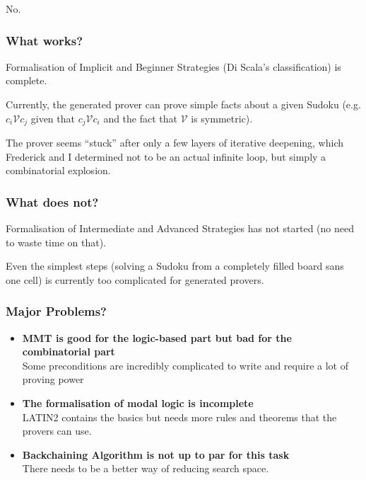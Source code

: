 \documentclass[aspectratio=169, usenames, dvipsnames]{beamer}
\newcommand{\MMT}{\textsf{MMT}\xspace}
\begin{document}
\begin{frame}
\begin{center}
\Huge
No.
\end{center}
\end{frame}

\begin{frame}
\frametitle{What works?}

Formalisation of Implicit and Beginner Strategies (Di Scala's classification) is complete.
\bigskip\pause

Currently, the generated prover can prove simple facts about a given Sudoku (e.g. $c_i \mathcal{V} c_j$ given that $c_j \mathcal{V} c_i$ and the fact that $\mathcal{V}$ is symmetric).
\bigskip\pause

The prover seems ``stuck'' after only a few layers of iterative deepening, which Frederick and I determined not to be an actual infinite loop, but simply a combinatorial explosion.

\end{frame}

\begin{frame}
\frametitle{What does not?}
Formalisation of Intermediate and Advanced Strategies has not started (no need to waste time on that).
\bigskip\pause

Even the simplest steps (solving a Sudoku from a completely filled board sans one cell) is currently too complicated for generated provers.

\end{frame}

\begin{frame}
\frametitle{Major Problems?}

\begin{itemize}
\item \textbf{\MMT is good for the logic-based part but bad for the combinatorial part}\\
Some preconditions are incredibly complicated to write and require a lot of proving power
\medskip
\item \textbf{The formalisation of modal logic is incomplete}\\
LATIN2 contains the basics but needs more rules and theorems that the provers can use.
\medskip
\item \textbf{Backchaining Algorithm is not up to par for this task}\\
There needs to be a better way of reducing search space.
\end{itemize}

\end{frame}
\end{document}
